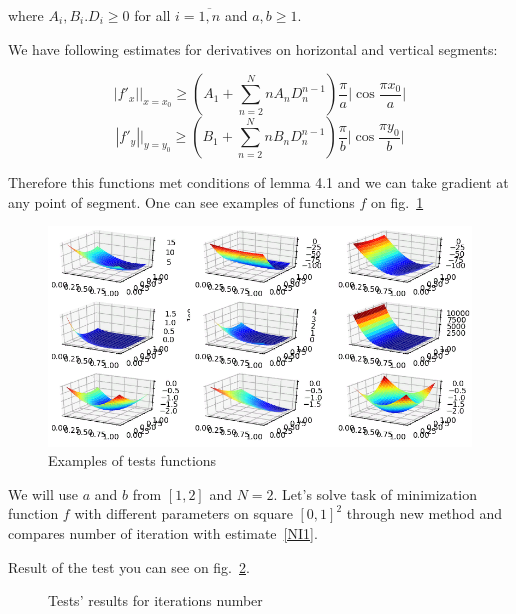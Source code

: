 \documentclass[12pt]{article}
\begin{document}
where $A_i, B_i. D_i\geq 0$ for all $i = \overline{1, n}$ and $a, b \geq 1$.

We have following estimates for derivatives on horizontal and vertical segments:

$$|f'_x|\Big|_{x = x_0} \geq \left(A_1 + \sum\limits_{n=2}^N n A_n D_n^{n-1}\right)\frac{\pi}{a}\Big|\cos \frac{\pi x_0}{a}\Big|$$
$$|f'_y|\Big|_{y = y_0} \geq \left(B_1 + \sum\limits_{n=2}^N n B_n D_n^{n-1}\right)\frac{\pi}{b}\Big|\cos \frac{\pi y_0}{b}\Big|$$

Therefore this functions met conditions of lemma 4.1 and we can take gradient at any point of segment. One can see examples of functions $f$ on fig.~\ref{fig:examples}

\begin{figure}[H]
\centering
\includegraphics[scale=0.6]{./Tests/Images/Examples.png}
\caption{Examples of tests functions}
\label{fig:examples}
\end{figure}

We will use $a$ and $b$ from $[1, 2]$ and $N = 2$. Let's solve task of minimization function $f$ with different parameters on square $[0,1]^2$ through new method and compares number of iteration with estimate~\eqref{NI1}.

Result of the test you can see on fig.~\ref{fig:image}.

\begin{figure}[h!]
\caption{Tests' results for iterations number}
\label{fig:image}
\end{figure}
\end{document}
